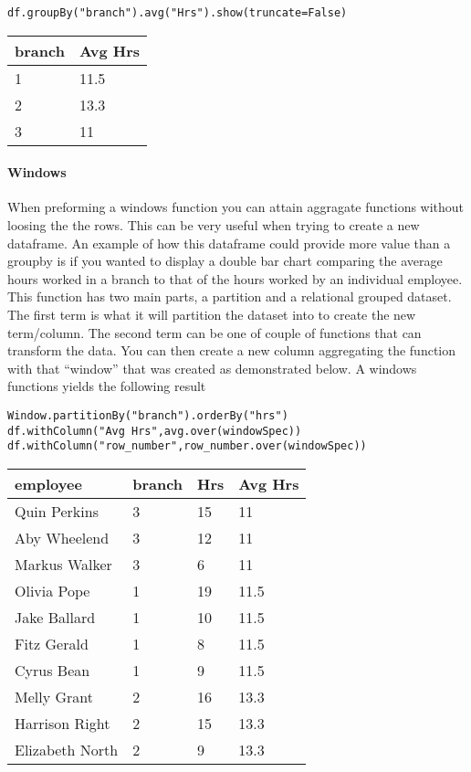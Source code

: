 \documentclass[
  letterpaper,
  DIV=11,
  numbers=noendperiod]{scrartcl}
\let\oldparagraph\paragraph
\renewcommand{\paragraph}[1]{\oldparagraph{#1}\mbox{}}
\begin{document}
\begin{verbatim}
df.groupBy("branch").avg("Hrs").show(truncate=False)
\end{verbatim}

\begin{longtable}[]{@{}ll@{}}
\toprule()
branch & Avg Hrs \\
\midrule()
\endhead
1 & 11.5 \\
2 & 13.3 \\
3 & 11 \\
\bottomrule()
\end{longtable}

\hypertarget{windows}{%
\paragraph{Windows}\label{windows}}

When preforming a windows function you can attain aggragate functions
without loosing the the rows. This can be very useful when trying to
create a new dataframe. An example of how this dataframe could provide
more value than a groupby is if you wanted to display a double bar chart
comparing the average hours worked in a branch to that of the hours
worked by an individual employee. This function has two main parts, a
partition and a relational grouped dataset. The first term is what it
will partition the dataset into to create the new term/column. The
second term can be one of couple of functions that can transform the
data. You can then create a new column aggregating the function with
that ``window'' that was created as demonstrated below. A windows
functions yields the following result

\begin{verbatim}
Window.partitionBy("branch").orderBy("hrs")
df.withColumn("Avg Hrs",avg.over(windowSpec))
df.withColumn("row_number",row_number.over(windowSpec))
\end{verbatim}

\begin{longtable}[]{@{}llll@{}}
\toprule()
employee & branch & Hrs & Avg Hrs \\
\midrule()
\endhead
Quin Perkins & 3 & 15 & 11 \\
Aby Wheelend & 3 & 12 & 11 \\
Markus Walker & 3 & 6 & 11 \\
Olivia Pope & 1 & 19 & 11.5 \\
Jake Ballard & 1 & 10 & 11.5 \\
Fitz Gerald & 1 & 8 & 11.5 \\
Cyrus Bean & 1 & 9 & 11.5 \\
Melly Grant & 2 & 16 & 13.3 \\
Harrison Right & 2 & 15 & 13.3 \\
Elizabeth North & 2 & 9 & 13.3 \\
\bottomrule()
\end{longtable}
\end{document}
